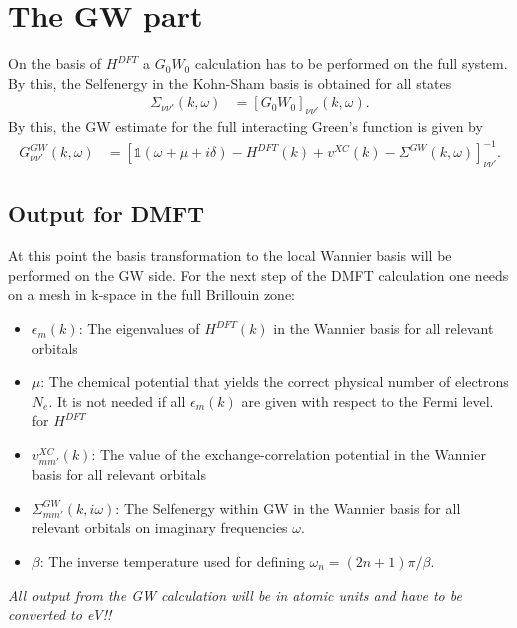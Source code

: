 \documentclass[12pt,a4paper]{scrartcl}
\numberwithin{equation}{section}
\newcommand{\GF}{Green's function}
\newcommand{\unity}{\mathds{1}}
\begin{document}


\section{The GW part}

On the basis of $H^{DFT}$ a $G_0W_0$ calculation has to be performed on the full
system. By this, the Selfenergy in the Kohn-Sham basis is obtained for all states
\begin{align}
 \Sigma_{\nu\nu'}(k,\omega)
 &= \left[ G_0W_0  \right]_{\nu\nu'}(k,\omega).
\end{align}
By this, the GW estimate for the full interacting {\GF} is given by
\begin{align}
 G^{GW}_{\nu\nu'}(k,\omega) 
 &= \left[ \unity(\omega +\mu +i\delta) -H^{DFT}(k)+v^{XC}(k) - \Sigma^{GW}(k,\omega)  \right]^{-1}_{\nu\nu'}.
\end{align}


\subsection{Output for DMFT}
At this point the basis transformation to the local Wannier basis will be
performed on the GW side.
For the next step of the DMFT calculation one needs
on a mesh in k-space in the full Brillouin zone:
\begin{itemize}
\item $\epsilon_m(k)$: The eigenvalues  of $H^{DFT}(k)$ in the Wannier basis
for all relevant orbitals
\item $\mu$: The chemical potential that yields the correct physical number of electrons $N_e$. It is not needed if all $\epsilon_m(k)$ are given 
with respect to the Fermi level.
for $H^{DFT}$
\item $v^{XC}_{mm'}(k)$: The value of the exchange-correlation potential 
in the Wannier basis for all relevant orbitals
\item $\Sigma^{GW}_{mm'}(k,i\omega)$: The Selfenergy within GW in the Wannier basis for all relevant orbitals on imaginary frequencies $\omega$.
\item $\beta$: The inverse temperature used for defining $\omega_n=(2n+1)\pi/\beta$.
\end{itemize}
{\it All output from the GW calculation will be in atomic units and
have to be converted to eV!!}
\end{document}

